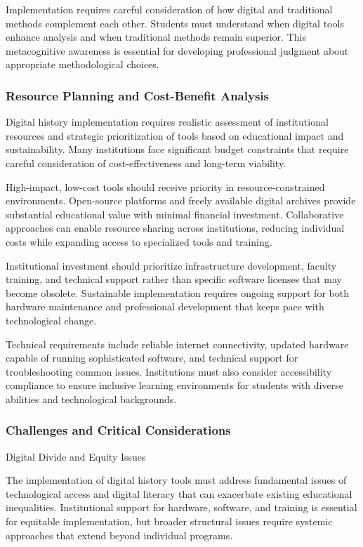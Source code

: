 Implementation requires careful consideration of how digital and traditional methods complement each other. Students must understand when digital tools enhance analysis and when traditional methods remain superior. This metacognitive awareness is essential for developing professional judgment about appropriate methodological choices.

\subsubsection  {Resource Planning and Cost-Benefit Analysis}

Digital history implementation requires realistic assessment of institutional resources and strategic prioritization of tools based on educational impact and sustainability. Many institutions face significant budget constraints that require careful consideration of cost-effectiveness and long-term viability.

High-impact, low-cost tools should receive priority in resource-constrained environments. Open-source platforms and freely available digital archives provide substantial educational value with minimal financial investment. Collaborative approaches can enable resource sharing across institutions, reducing individual costs while expanding access to specialized tools and training.

Institutional investment should prioritize infrastructure development, faculty training, and technical support rather than specific software licenses that may become obsolete. Sustainable implementation requires ongoing support for both hardware maintenance and professional development that keeps pace with technological change.

Technical requirements include reliable internet connectivity, updated hardware capable of running sophisticated software, and technical support for troubleshooting common issues. Institutions must also consider accessibility compliance to ensure inclusive learning environments for students with diverse abilities and technological backgrounds.

\subsubsection {Challenges and Critical Considerations}

  Digital Divide and Equity Issues

The implementation of digital history tools must address fundamental issues of technological access and digital literacy that can exacerbate existing educational inequalities. Institutional support for hardware, software, and training is essential for equitable implementation, but broader structural issues require systemic approaches that extend beyond individual programs.

